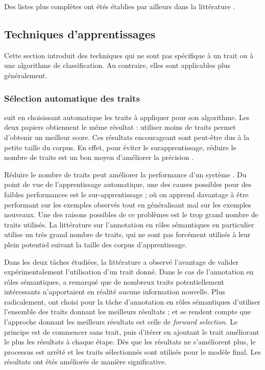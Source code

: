 Des listes plus complètes ont étés établies par ailleurs dans la littérature \citep{pradhan2005semantic,marquez2008semantic,palmer2010semantic}.

\subsection{Techniques d'apprentissages}

Cette section introduit des techniques qui ne sont pas spécifique à un trait ou à une algorithme de classification. Au contraire, elles sont applicables plus généralement.

\subsubsection{Sélection automatique des traits}

\cite{dinu2007sometimes} suit \cite{mihalcea2002instance} en choisissant automatique les traits à appliquer pour son algorithme. Les deux papiers obtiennent le même résultat : utiliser moins de traits permet d'obtenir un meilleur score. Ces résultats encourageant sont peut-être dus à la petite taille du corpus. En effet, pour éviter le surapprentissage, réduire le nombre de traits est un bon moyen d'améliorer la précision \citep{van2004bias}.


Réduire le nombre de traits peut améliorer la performance d'un système \cite{mihalcea2002instance,dinu2007sometimes}. Du point de vue de l'apprentissage automatique, une des causes possibles pour des faibles performances est le sur-apprentissage ; où on apprend davantage à être performant sur les exemples observés tout en généralisant mal sur les exemples nouveaux. Une des raisons possibles de ce problèmes est le trop grand nombre de traits utilisés. La littérature sur l'annotation en rôles sémantiques en particulier utilise un très grand nombre de traits, qui ne sont pas forcément utilisés à leur plein potentiel suivant la taille des corpus d'apprentissage.

Dans les deux tâches étudiées, la littérature a observé l'avantage de valider expérimentalement l'utilisation d'un trait donné. Dans le cas de l'annotation en rôles sémantiques, \cite{xue2004calibrating} a remarqué que de nombreux traits potentiellement intéressants n'apportaient en réalité aucune information nouvelle. Plus radicalement, \cite{mihalcea2002instance,dinu2007sometimes} ont choisi pour la tâche d'annotation en rôles sémantiques d'utiliser l'ensemble des traits donnant les meilleurs résultats ; et se rendent compte que l'approche donnant les meilleurs résultats est celle de \textit{forward selection}. Le principe est de commencer sans trait, puis d'itérer en ajoutant le trait améliorant le plus les résultats à chaque étape. Dès que les résultats ne s'améliorent plus, le processus est arrêté et les traits sélectionnés sont utilisés pour le modèle final. Les résultats ont étés améliorés de manière significative.

